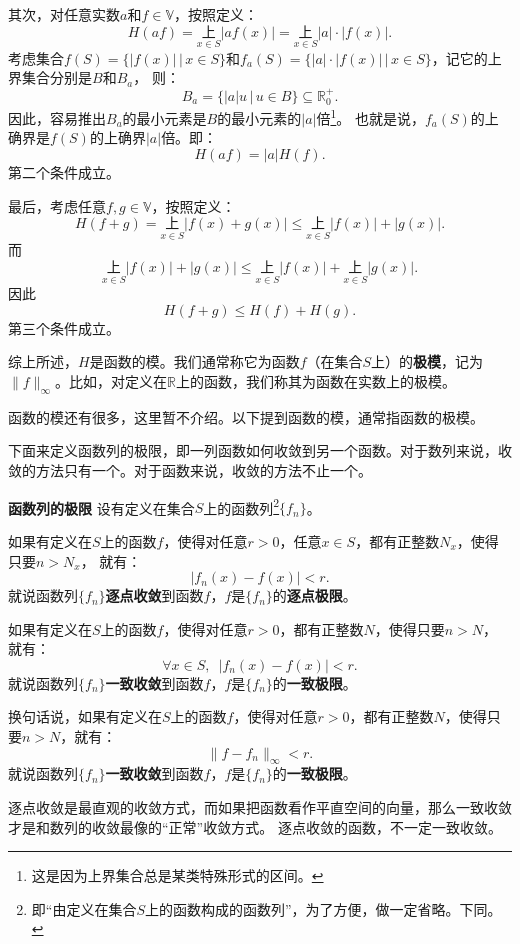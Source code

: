 \documentclass[12pt,UTF8]{ctexbook}
\begin{document}
\begin{appendix}
其次，对任意实数$a$和$f\in\mathbb{V}$，按照定义：
$$ H(af) = \underset{x\in S}{\text{上}} |af(x)| = \underset{x\in S}{\text{上}} |a|\cdot |f(x)|. $$
考虑集合$f(S) = \{ |f(x)| \, | \, x\in S\}$和$f_a(S) = \{|a|\cdot |f(x)| \, | \, x\in S\}$，记它的上界集合分别是$B$和$B_a$，
则：
$$ B_a = \{|a| u \, | \, u \in B\} \subseteq \mathbb{R}_0^+. $$
因此，容易推出$B_a$的最小元素是$B$的最小元素的$|a|$倍\footnote{这是因为上界集合总是某类特殊形式的区间。}。
也就是说，$f_a(S)$的上确界是$f(S)$的上确界$|a|$倍。即：
$$ H(af) = |a| H(f). $$
第二个条件成立。

最后，考虑任意$f,g \in \mathbb{V}$，按照定义：
$$ H(f + g) = \underset{x\in S}{\text{上}} |f(x) + g(x)| \leqslant \underset{x\in S}{\text{上}} |f(x)| + |g(x)|. $$
而
$$ \underset{x\in S}{\text{上}} |f(x)| + |g(x)| \leqslant \underset{x\in S}{\text{上}} |f(x)| + \underset{x\in S}{\text{上}}|g(x)|.$$
因此
$$ H(f + g) \leqslant H(f) + H(g).$$
第三个条件成立。

综上所述，$H$是函数的模。我们通常称它为函数$f$（在集合$S$上）的\textbf{极模}，记为$\|f\|_{\infty}$。比如，对定义在$\mathbb{R}$上的函数，我们称其为函数在实数上的极模。

函数的模还有很多，这里暂不介绍。以下提到函数的模，通常指函数的极模。

下面来定义函数列的极限，即一列函数如何收敛到另一个函数。对于数列来说，收敛的方法只有一个。对于函数来说，收敛的方法不止一个。

\begin{df}{\textbf{函数列的极限}}
    设有定义在集合$S$上的函数列\footnote{即“由定义在集合$S$上的函数构成的函数列”，为了方便，做一定省略。下同。}$\{f_n\}$。
    
    如果有定义在$S$上的函数$f$，使得对任意$r>0$，任意$x\in S$，都有正整数$N_x$，使得只要$n>N_x$，
    就有：
    $$ |f_n(x) - f(x) | < r.$$
    就说函数列$\{f_n\}$\textbf{逐点收敛}到函数$f$，$f$是$\{f_n\}$的\textbf{逐点极限}。

    如果有定义在$S$上的函数$f$，使得对任意$r>0$，都有正整数$N$，使得只要$n>N$，
    就有：
    $$ \forall x\in S, \,\,\,|f_n(x) - f(x) | < r.$$
    就说函数列$\{f_n\}$\textbf{一致收敛}到函数$f$，$f$是$\{f_n\}$的\textbf{一致极限}。

    换句话说，如果有定义在$S$上的函数$f$，使得对任意$r>0$，都有正整数$N$，使得只要$n>N$，就有：
    $$ \| f - f_n \|_{\infty} < r.$$
    就说函数列$\{f_n\}$\textbf{一致收敛}到函数$f$，$f$是$\{f_n\}$的\textbf{一致极限}。
\end{df}

逐点收敛是最直观的收敛方式，而如果把函数看作平直空间的向量，那么一致收敛才是和数列的收敛最像的“正常”收敛方式。
逐点收敛的函数，不一定一致收敛。


\end{appendix}
\end{document}
